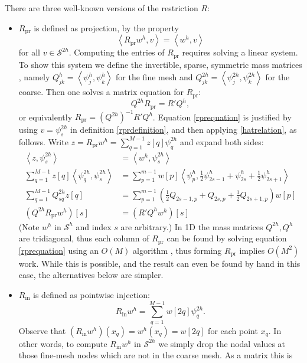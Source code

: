 \documentclass[letterpaper,final,12pt,reqno]{amsart}
\newcommand{\ip}[2]{\left<#1,#2\right>}
\newcommand{\Rpr}{R_{\text{pr}}}
\newcommand{\Rin}{R_{\text{in}}}
\begin{document}
There are three well-known versions of the restriction $R$:
\begin{itemize}
\item $\Rpr$ is defined as projection, by the property
\begin{equation}
  \ip{\Rpr w^h}{v} = \ip{w^h}{v} \label{rprdefinition}
\end{equation}
for all $v\in \mathcal{S}^{2h}$.  Computing the entries of $\Rpr$ requires solving a linear system.  To show this system we define the invertible, sparse, symmetric mass matrices \cite{Elmanetal2014}, namely $Q_{jk}^{h} = \ip{\psi_j^{h}}{\psi_k^{h}}$ for the fine mesh and $Q_{jk}^{2h} = \ip{\psi_j^{2h}}{\psi_k^{2h}}$ for the coarse.  Then one solves a matrix equation for $\Rpr$:
\begin{equation}
  Q^{2h} \Rpr = R' Q^{h},  \label{rprequation}
\end{equation}
or equivalently $\Rpr = (Q^{2h})^{-1} R' Q^{h}$.  Equation \eqref{rprequation} is justified by using $v=\psi_s^{2h}$ in definition \eqref{rprdefinition}, and then applying \eqref{hatrelation}, as follows.  Write $z = \Rpr w^h = \sum_{q=1}^{M-1} z[q] \psi_q^{2h}$ and expand both sides:
\begin{align*}
\ip{z}{\psi_s^{2h}} &= \ip{w^h}{\psi_s^{2h}} \\
\sum_{q=1}^{M-1} z[q] \ip{\psi_q^{2h}}{\psi_s^{2h}} &= \sum_{p=1}^{m-1} w[p] \ip{\psi_p^{h}}{\frac{1}{2} \psi_{2s-1}^{h} + \psi_{2s}^{h} + \frac{1}{2} \psi_{2s+1}^{h}} \\
\sum_{q=1}^{M-1} Q_{sq}^{2h} z[q] &= \sum_{p=1}^{m-1} \left(\frac{1}{2} Q_{2s-1,p} + Q_{2s,p} + \frac{1}{2} Q_{2s+1,p}\right) w[p] \\
(Q^{2h} \Rpr w^h)[s] &= (R' Q^h w^h)[s]
\end{align*}
(Note $w^h$ in $\mathcal{S}^h$ and index $s$ are arbitrary.)  In 1D the mass matrices $Q^{2h},Q^h$ are tridiagonal, thus each column of $\Rpr$ can be found by solving equation \eqref{rprequation} using an $O(M)$ algorithm \cite{TrefethenBau1997}, thus forming $\Rpr$ implies $O(M^2)$ work.  While this is possible, and the result can even be found by hand in this case, the alternatives below are simpler.
\item $\Rin$ is defined as pointwise injection:
\begin{equation}
  \Rin w^h = \sum_{q=1}^{M-1} w[2q] \psi_q^{2h}. \label{rindefinition}
\end{equation}
Observe that $(\Rin w^h)(x_q) = w^h(x_q) = w[2q]$ for each point $x_q$.  In other words, to compute $\Rin w^h$ in $\mathcal{S}^{2h}$ we simply drop the nodal values at those fine-mesh nodes which are not in the coarse mesh.  As a matrix this is

\end{itemize}
\end{document}
